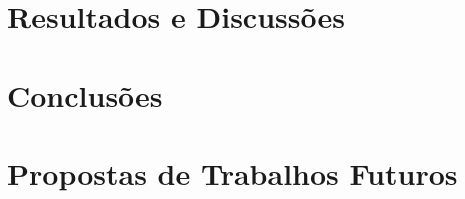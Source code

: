 	\chapter{Resultados e Discussões}

	\chapter{Conclusões}

	\chapter{Propostas de Trabalhos Futuros}

	\postextual
	

	\begin{apendicesenv}
	\partapendices
\end{apendicesenv}

	\begin{anexosenv}
	\partanexos
\end{anexosenv}


